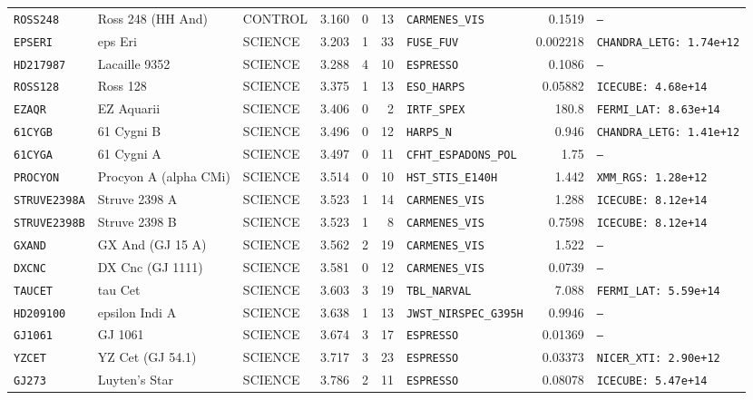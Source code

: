 \documentclass[twocolumn,10pt]{article}
\begin{document}
\begin{table}[!ht]
{\begin{tabular}{llllrrlrl}
\texttt{ROSS248} & Ross 248 (HH And) & CONTROL & 3.160 & 0 & 13 & \texttt{CARMENES\_VIS} & 0.1519 & \texttt{---} \\
\texttt{EPSERI} & eps Eri & SCIENCE & 3.203 & 1 & 33 & \texttt{FUSE\_FUV} & 0.002218 & \texttt{CHANDRA\_LETG: 1.74e+12} \\
\texttt{HD217987} & Lacaille 9352 & SCIENCE & 3.288 & 4 & 10 & \texttt{ESPRESSO} & 0.1086 & \texttt{---} \\
\texttt{ROSS128} & Ross 128 & SCIENCE & 3.375 & 1 & 13 & \texttt{ESO\_HARPS} & 0.05882 & \texttt{ICECUBE: 4.68e+14} \\
\texttt{EZAQR} & EZ Aquarii & SCIENCE & 3.406 & 0 & 2 & \texttt{IRTF\_SPEX} & 180.8 & \texttt{FERMI\_LAT: 8.63e+14} \\
\texttt{61CYGB} & 61 Cygni B & SCIENCE & 3.496 & 0 & 12 & \texttt{HARPS\_N} & 0.946 & \texttt{CHANDRA\_LETG: 1.41e+12} \\
\texttt{61CYGA} & 61 Cygni A & SCIENCE & 3.497 & 0 & 11 & \texttt{CFHT\_ESPADONS\_POL} & 1.75 & \texttt{---} \\
\texttt{PROCYON} & Procyon A (alpha CMi) & SCIENCE & 3.514 & 0 & 10 & \texttt{HST\_STIS\_E140H} & 1.442 & \texttt{XMM\_RGS: 1.28e+12} \\
\texttt{STRUVE2398A} & Struve 2398 A & SCIENCE & 3.523 & 1 & 14 & \texttt{CARMENES\_VIS} & 1.288 & \texttt{ICECUBE: 8.12e+14} \\
\texttt{STRUVE2398B} & Struve 2398 B & SCIENCE & 3.523 & 1 & 8 & \texttt{CARMENES\_VIS} & 0.7598 & \texttt{ICECUBE: 8.12e+14} \\
\texttt{GXAND} & GX And (GJ 15 A) & SCIENCE & 3.562 & 2 & 19 & \texttt{CARMENES\_VIS} & 1.522 & \texttt{---} \\
\texttt{DXCNC} & DX Cnc (GJ 1111) & SCIENCE & 3.581 & 0 & 12 & \texttt{CARMENES\_VIS} & 0.0739 & \texttt{---} \\
\texttt{TAUCET} & tau Cet & SCIENCE & 3.603 & 3 & 19 & \texttt{TBL\_NARVAL} & 7.088 & \texttt{FERMI\_LAT: 5.59e+14} \\
\texttt{HD209100} & epsilon Indi A & SCIENCE & 3.638 & 1 & 13 & \texttt{JWST\_NIRSPEC\_G395H} & 0.9946 & \texttt{---} \\
\texttt{GJ1061} & GJ 1061 & SCIENCE & 3.674 & 3 & 17 & \texttt{ESPRESSO} & 0.01369 & \texttt{---} \\
\texttt{YZCET} & YZ Cet (GJ 54.1) & SCIENCE & 3.717 & 3 & 23 & \texttt{ESPRESSO} & 0.03373 & \texttt{NICER\_XTI: 2.90e+12} \\
\texttt{GJ273} & Luyten's Star & SCIENCE & 3.786 & 2 & 11 & \texttt{ESPRESSO} & 0.08078 & \texttt{ICECUBE: 5.47e+14} \\

\end{tabular}}
\end{table}
\end{document}
